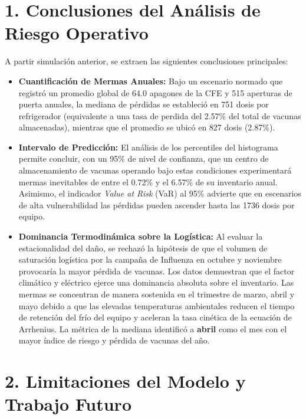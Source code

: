 \documentclass[
  spanish,
  letterpaper,
  DIV=11,
  numbers=noendperiod]{scrreprt}
\providecommand{\tightlist}{%
  \setlength{\itemsep}{0pt}\setlength{\parskip}{0pt}}
\theoremstyle{plain}
\theoremstyle{definition}
\theoremstyle{remark}
\begin{document}
\section{1. Conclusiones del Análisis de Riesgo
Operativo}\label{conclusiones-del-anuxe1lisis-de-riesgo-operativo}

A partir simulación anterior, se extraen las siguientes conclusiones
principales:

\begin{itemize}
\tightlist
\item
  \textbf{Cuantificación de Mermas Anuales:} Bajo un escenario normado
  que registró un promedio global de 64.0 apagones de la CFE y 515
  aperturas de puerta anuales, la mediana de pérdidas se estableció en
  751 dosis por refrigerador (equivalente a una tasa de perdida del
  2.57\% del total de vacunas almacenadas), mientras que el promedio se
  ubicó en 827 dosis (2.87\%).
\item
  \textbf{Intervalo de Predicción:} El análisis de los percentiles del
  histograma permite concluir, con un 95\% de nivel de confianza, que un
  centro de almacenamiento de vacunas operando bajo estas condiciones
  experimentará mermas inevitables de entre el 0.72\% y el 6.57\% de su
  inventario anual. Asimismo, el indicador \emph{Value at Risk} (VaR) al
  95\% advierte que en escenarios de alta vulnerabilidad las pérdidas
  pueden ascender hasta las 1736 dosis por equipo.
\item
  \textbf{Dominancia Termodinámica sobre la Logística:} Al evaluar la
  estacionalidad del daño, se rechazó la hipótesis de que el volumen de
  saturación logística por la campaña de Influenza en octubre y
  noviembre provocaría la mayor pérdida de vacunas. Los datos demuestran
  que el factor climático y eléctrico ejerce una dominancia absoluta
  sobre el inventario. Las mermas se concentran de manera sostenida en
  el trimestre de marzo, abril y mayo debido a que las elevadas
  temperaturas ambientales reducen el tiempo de retención del frío del
  equipo y aceleran la tasa cinética de la ecuación de Arrhenius. La
  métrica de la mediana identificó a \textbf{abril} como el mes con el
  mayor índice de riesgo y pérdida de vacunas del año.
\end{itemize}

\section{2. Limitaciones del Modelo y Trabajo
Futuro}\label{limitaciones-del-modelo-y-trabajo-futuro}
\end{document}
